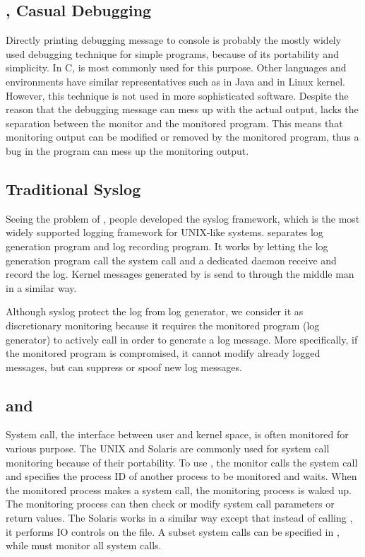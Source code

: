 \subsection{, Casual Debugging}
\label{sec:printf}

Directly printing debugging message to console
is probably the mostly widely used debugging technique
for simple programs, because of its portability and simplicity.
In C,  is most commonly used for this purpose.
Other languages and environments have similar representatives
such as  in Java and
 in Linux kernel.
However, this technique is not used in more sophisticated software.
Despite the reason that the debugging message can mess up
with the actual output,  lacks the
separation between the monitor and the monitored program.
This means that monitoring output can be modified or removed by the monitored
program, thus a bug in the program can mess up the monitoring output.


\subsection{Traditional Syslog}
\label{sec:syslog}

Seeing the problem of , people developed the syslog
framework, which is the most widely supported logging framework for UNIX-like systems.
 separates log generation program and log recording program.
It works by letting the log generation program call the 
system call and a dedicated daemon  receive and record the log.
Kernel messages generated by  is send to  through
the middle man  in a similar way.

Although syslog protect the log from log generator,
we consider it as discretionary monitoring because it
requires the monitored program (log generator) to actively call
 in order to generate a log message.
More specifically, if the monitored program is compromised,
it cannot modify already logged messages, but can suppress or spoof
new log messages.

\subsection{ and }
\label{sec:ptrace}

System call, the interface between user and kernel space,
is often monitored for various purpose.
The UNIX  and Solaris  are commonly
used for system call monitoring because of their portability.
To use , the monitor calls the  system call
and specifies the process ID of another process to be monitored and waits.
When the monitored process makes a system call, the monitoring
process is waked up.
The monitoring process can then check or modify
system call parameters or return values.
The Solaris  works in a similar way except that
instead of calling , it performs IO controls on the
 file.
A subset system calls can be specified in ,
while  must monitor all system calls.

